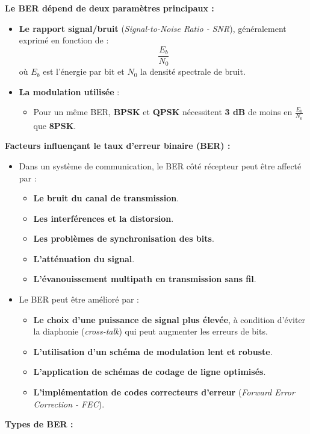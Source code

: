 \textbf{Le BER dépend de deux paramètres principaux :}
\begin{itemize}
    \item \textbf{Le rapport signal/bruit} (\textit{Signal-to-Noise Ratio - SNR}), généralement exprimé en fonction de :
    \[
    \frac{E_b}{N_0}
    \]
    où \(E_b\) est l'énergie par bit et \(N_0\) la densité spectrale de bruit.
    \item \textbf{La modulation utilisée} :
    \begin{itemize}
        \item Pour un même BER, \textbf{BPSK} et \textbf{QPSK} nécessitent \textbf{3 dB} de moins en \(\frac{E_b}{N_0}\) que \textbf{8PSK}.
    \end{itemize}
\end{itemize}
\textbf{Facteurs influençant le taux d'erreur binaire (BER) :}
\begin{itemize}
    \item Dans un système de communication, le BER côté récepteur peut être affecté par :
    \begin{itemize}
        \item \textbf{Le bruit du canal de transmission}.
        \item \textbf{Les interférences et la distorsion}.
        \item \textbf{Les problèmes de synchronisation des bits}.
        \item \textbf{L'atténuation du signal}.
        \item \textbf{L'évanouissement multipath en transmission sans fil}.
    \end{itemize}
    \item Le BER peut être amélioré par :
    \begin{itemize}
        \item \textbf{Le choix d'une puissance de signal plus élevée}, à condition d'éviter la diaphonie (\textit{cross-talk}) qui peut augmenter les erreurs de bits.
        \item \textbf{L'utilisation d'un schéma de modulation lent et robuste}.
        \item \textbf{L'application de schémas de codage de ligne optimisés}.
        \item \textbf{L'implémentation de codes correcteurs d'erreur} (\textit{Forward Error Correction - FEC}).
    \end{itemize}
\end{itemize}
\textbf{Types de BER :}
